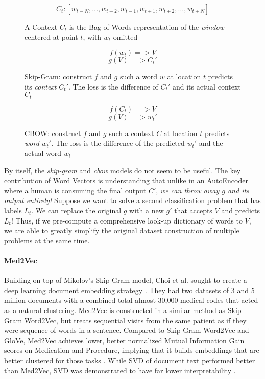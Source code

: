 \begin{figure}[H]
\[ C_t: [w_{t-N}, \ldots, w_{t-2}, w_{t-1}, w_{t+1}, w_{t+2}, \ldots, w_{t+N}] \]
\caption{A Context $C_t$ is the Bag of Words representation of the \textit{window} centered at point $t$, with $w_t$ omitted}
\end{figure}


\begin{figure}[H]
\[ f(w_t) => V \]
\[ g(V) => C_t' \]
\caption{Skip-Gram: construct $f$ and $g$ such a word $w$ at location $t$ predicts its \textit{context} $C_t'$. The loss is the difference of $C_t'$ and its actual context $C_t$}
\end{figure}

\begin{figure}[H]
\[ f(C_t) => V \]
\[ g(V) => w_t' \]
\caption{CBOW: construct $f$ and $g$ such a context $C$ at location $t$ predicts \textit{word} $w_t'$. The loss is the difference of the predicted $w_t'$ and the actual word $w_t$}
\end{figure}

\par{
By itself, the \textit{skip-gram} and \textit{cbow} models do not seem to be useful. The key contribution of Word Vectors is understanding that unlike in an AutoEncoder where a human is consuming the final output $C'$, \textit{we can throw away $g$ and its output entirely!} Suppose we want to solve a second classification problem that has labels $L_t$. We can replace the original $g$ with a new $g'$ that accepts $V$ and predicts $L_t$! Thus, if we pre-compute a comprehensive look-up dictionary of words to $V$, we are able to greatly simplify the original dataset construction of multiple problems at the same time. 
}

\paragraph{Med2Vec} \label{sec:med2vec} Building on top of Mikolov's Skip-Gram model, Choi et al. sought to create a deep learning document embedding strategy \cite{med2vec}. They had two datasets of 3 and 5 million documents with a combined total almost 30,000 medical codes that acted as a natural clustering. \textsf{Med2Vec} is constructed in a similar method as \textsf{Skip-Gram Word2Vec}, but treats sequential visits from the same patient as if they were sequence of words in a sentence. Compared to \textsf{Skip-Gram Word2Vec} and \textsf{GloVe}, \textsf{Med2Vec} achieves lower, better normalized Mutual Information Gain scores on Medication and Procedure, implying that it builds embeddings that are better clustered for those tasks \cite{GloVe}. While \textsf{SVD} of document text performed better than \textsf{Med2Vec}, \textsf{SVD} was demonstrated to have far lower interpretability \cite{svd}. 

